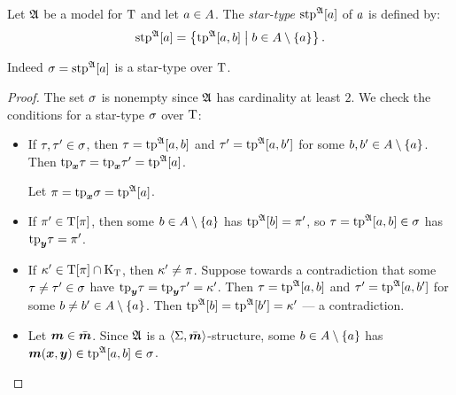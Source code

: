 \begin{definition}
Let $\mathfrak{A}$ be a model for $\mathrm{T}$
and let $a\in A$.
The \emph{star-type} $\operatorname{stp}^{\mathfrak{A}}[a]$ of $a$ is defined by:
\[
  \operatorname{stp}^{\mathfrak{A}}[a] = \left\{\operatorname{tp}^{\mathfrak{A}}[a,b]\mathrel{}\middle|\mathrel{}b \in A \setminus \left\{a\right\}\right\}.
\]
\end{definition}
\begin{remark}
Indeed $\sigma = \operatorname{stp}^{\mathfrak{A}}[a]$ is a star-type over $\mathrm{T}$.
\end{remark}
\begin{proof}
The set $\sigma$ is nonempty since $\mathfrak{A}$ has cardinality at least $2$.
We check the conditions for a star-type $\sigma$ over $\mathrm{T}$:
\begin{itemize}
  \item[\refcondstpx]
  If $\tau,{\tau'}\in\sigma$,
  then $\tau=\operatorname{tp}^{\mathfrak{A}}[a,b]$ and ${\tau'}=\operatorname{tp}^{\mathfrak{A}}[a,{b'}]$ for some
  $b,{b'}\in A\setminus\left\{a\right\}$.
  Then $\mathrm{tp}_{\bm{x}}\tau = \mathrm{tp}_{\bm{x}}{\tau'} = \operatorname{tp}^{\mathfrak{A}}[a]$.
  
  Let $\pi = \mathrm{tp}_{\bm{x}}\sigma = \operatorname{tp}^{\mathfrak{A}}[a]$.
  \item[\refcondstppy]
  If ${\pi'}\in\mathrm{T}[\pi]$,
  then some $b\in A\setminus\left\{a\right\}$ has $\operatorname{tp}^{\mathfrak{A}}[b] = {\pi'}$, so
  $\tau = \operatorname{tp}^{\mathfrak{A}}[a,b] \in \sigma$ has $\mathrm{tp}_{\bm{y}}\tau = {\pi'}$.
  \item[\refcondstpky]
  If ${\kappa'}\in\mathrm{T}[\pi]\cap{\mathrm{K}}_{\mathrm{T}}$, then ${\kappa'}\neq\pi$.
  Suppose towards a contradiction that some $\tau\neq{\tau'}\in\sigma$ have
  $\mathrm{tp}_{\bm{y}}\tau=\mathrm{tp}_{\bm{y}}{\tau'}={\kappa'}$.
  Then $\tau=\operatorname{tp}^{\mathfrak{A}}[a,b]$ and ${\tau'}=\operatorname{tp}^{\mathfrak{A}}[a,{b'}]$ for some
  $b\neq{b'}\in A\setminus\left\{a\right\}$.
  Then $\operatorname{tp}^{\mathfrak{A}}[b]=\operatorname{tp}^{\mathfrak{A}}[{b'}]={\kappa'}$ --- a contradiction.
  \item[\refcondstpm]
  Let $\bm{m}\in\bar{\bm{m}}$.
  Since $\mathfrak{A}$ is a $\left\langle \mathrm{\Sigma},\bar{\bm{m}} \right\rangle$-structure, some $b\in A\setminus\left\{a\right\}$
  has $\bm{m}(\bm{x},\bm{y}) \in \operatorname{tp}^{\mathfrak{A}}[a,b] \in \sigma$.
\end{itemize}
\end{proof}

